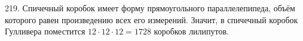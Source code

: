 219. Спичечный коробок имеет форму прямоугольного параллелепипеда, объём которого равен произведению всех его измерений. Значит, в спичечный коробок Гулливера поместится $12\cdot12\cdot12=1728$ коробков лилипутов.\\
